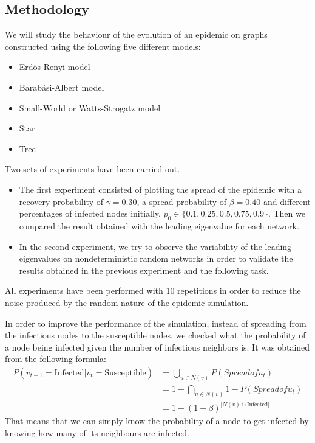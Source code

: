 \subsection{Methodology}
We will study the behaviour of the evolution of an epidemic on graphs constructed using the following five different models:
\begin{itemize}
\item Erdös-Renyi model
\item Barabási-Albert model
\item Small-World or Watts-Strogatz model
\item Star
\item Tree
\end{itemize}

Two sets of experiments have been carried out.
\begin{itemize}
\item The first experiment consisted of plotting the spread of the epidemic with a recovery probability of $\gamma = 0.30$, a spread probability of $\beta = 0.40$ and different percentages of infected nodes initially, $p_0 \in \{0.1,0.25, 0.5, 0.75, 0.9\}$. Then we compared the result obtained with the leading eigenvalue for each network.
\item In the second experiment, we try to observe the variability of the leading eigenvalues on nondeterministic random networks in order to validate the results obtained in the previous experiment and the following task. 
\end{itemize}

All experiments have been performed with 10 repetitions in order to reduce the noise produced by the random nature of the epidemic simulation.

In order to improve the performance of the simulation, instead of spreading from the infectious nodes to the susceptible nodes, we checked what the probability of a node being infected given the number of infectious neighbors is. It was obtained from the following formula:
\begin{align*}
    P(v_{t+1} = \text{Infected}| v_{t} = \text{Susceptible}) &= \bigcup_{u \in N(v)} P(Spread of u_t) \\
    &= 1 - \bigcap_{u \in N(v)} 1 - P(Spread of u_t) \\
    &= 1 - (1-\beta)^{|N(v)\cap \text{Infected}|}
\end{align*}
That means that we can simply know the probability of a node to get infected by knowing how many of its neighbours are infected. 


